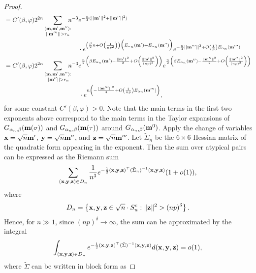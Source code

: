 \documentclass[11pt,oneside]{amsart}
\numberwithin{equation}{section}  %
\theoremstyle{plain}
\theoremstyle{remark}
\def \bm {{\bf m}}
\begin{document}
\begin{proof}
\begin{equation}
\begin{split}
 &= C'(\beta,\varphi)2^{2n} \sum_{\substack{(\bm,\bm',\bm''): 
 \\ || \bm'''||>r_n}} \!\!\!\! n^{-3}  e^{-\frac{n}{4}(||\bm'||^2+||\bm''||^2)} \\
 & \qquad \qquad \qquad \qquad \qquad \qquad\cdot e^{
 \left(\frac{\beta}{2}n+O\left(\frac{1}{np^2}\right)\right)
\Big( E_{\alpha_n} (\bm') +E_{\alpha_n} (\bm'') \Big) }e^{-\frac{n}{4}||\bm'''||^2+O\left(\frac{1}{p}\right) E_{\alpha_n} (\bm''')} \\
& = C'(\beta,\varphi)2^{2n}\sum_{\substack{(\bm,\bm',\bm''): 
\\ || \bm''||>r_n}} \!\!\!\! n^{-3}  e^{\frac{n}{2} \left( \beta E_{\alpha_n}(\bm') -\frac{\| \bm'\|^2}{2}+O\left(\frac{\|\bm'\|^2}{(np)^2}\right)\right)} e^{\frac{n}{2} \left( \beta E_{\alpha_n}(\bm'') -\frac{\| \bm'' \|^2}{2}+O\left(\frac{\|\bm''\|^2}{(np)^2}\right)\right)} \\
& \qquad \qquad \qquad \qquad \qquad \quad \,\,\,\,\,\,\, \cdot e^{n \left (-\frac{||\bm'''||^2}{4}+O\left(\frac{1}{np}\right) E_{\alpha_n} (\bm''')\right) },
\end{split}
\end{equation}
for some constant $C'(\beta,\varphi) >0.$ Note that the main terms in the first two exponents above correspond to the main terms in the Taylor expansions of $G_{\alpha_n,\beta}(\bm(\sigma))$ and $G_{\alpha_n,\beta}(\bm(\tau))$ around $G_{\alpha_n,\beta}(\bm^0)$. Apply the change of variables ${\bf x} =\sqrt{n}\bm'$, ${\bf y} =\sqrt{n}\bm''$, and ${\bf z} =\sqrt{n} \bm'''$. Let $\tilde \Sigma_n$ be the $6\times 6$ Hessian matrix of the quadratic form appearing in the exponent. Then the sum over atypical pairs can be expressed as the Riemann sum
\begin{equation*}
\sum_{({\bf x}, {\bf y}, {\bf z}) \in D_n}
\frac{1}{n^3}
 e^{-\frac{1}{2} ({\bf x}, {\bf y}, {\bf z})^\top (\tilde \Sigma_n)^{-1} ({\bf x}, {\bf y}, {\bf z})} (1+o(1)),
\end{equation*}
where
$$
D_n = \left\{ {\bf x}, {\bf y}, {\bf z} \in \sqrt{n}\cdot S_n^c: \|{\bf z}\|^2 > (np)^{\delta}  \right\}.
$$
Hence, for $n\gg 1$, since $(np)^{\delta} \to \infty$, the sum can be approximated by the integral
\begin{equation}
\label{eq:intDN}
\int_{({\bf x}, {\bf y}, {\bf z}) \in D_n}
 e^{-\frac{1}{2} ({\bf x}, {\bf y}, {\bf z}) ^\top (\tilde \Sigma)^{-1} ({\bf x}, {\bf y}, {\bf z})} d({\bf x}, {\bf y}, {\bf z}) =o(1),
\end{equation}
where $\tilde \Sigma$ can be written in block form as

\end{proof}
\end{document}
